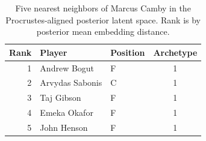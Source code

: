 \begin{table}[htbp]
  \centering\small
  \begin{tabular}{rllc}
    \toprule
    Rank & Player & Position & Archetype \\
    \midrule
    1 & Andrew Bogut & F & 1 \\
    2 & Arvydas Sabonis & C & 1 \\
    3 & Taj Gibson & F & 1 \\
    4 & Emeka Okafor & F & 1 \\
    5 & John Henson & F & 1 \\
    \bottomrule
  \end{tabular}
  \caption{Five nearest neighbors of Marcus Camby in the Procrustes-aligned posterior latent space. Rank is by posterior mean embedding distance.}
  \label{tab:Marcus_Camby_neighbors}
\end{table}

